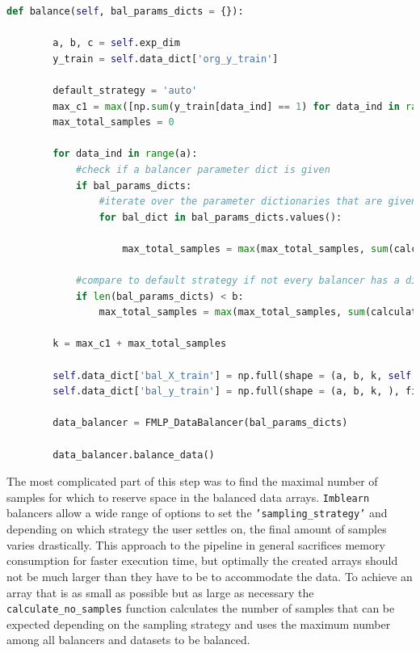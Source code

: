\begin{lstlisting}[language=Python, numbers=none]
    def balance(self, bal_params_dicts = {}):

        a, b, c = self.exp_dim
        y_train = self.data_dict['org_y_train']

        default_strategy = 'auto'
        max_c1 = max([np.sum(y_train[data_ind] == 1) for data_ind in range(a)])
        max_total_samples = 0

        for data_ind in range(a):
            #check if a balancer parameter dict is given
            if bal_params_dicts:
                #iterate over the parameter dictionaries that are given
                for bal_dict in bal_params_dicts.values():

                    max_total_samples = max(max_total_samples, sum(calculate_no_samples(y_train[data_ind], bal_dict['sampling_strategy']).values()))

            #compare to default strategy if not every balancer has a dict
            if len(bal_params_dicts) < b:
                max_total_samples = max(max_total_samples, sum(calculate_no_samples(y_train[data_ind], default_strategy).values()))
        
        k = max_c1 + max_total_samples

        self.data_dict['bal_X_train'] = np.full(shape = (a, b, k, self.d), fill_value = np.nan)
        self.data_dict['bal_y_train'] = np.full(shape = (a, b, k, ), fill_value = np.nan)

        data_balancer = FMLP_DataBalancer(bal_params_dicts)
        
        data_balancer.balance_data()
\end{lstlisting}

The most complicated part of this step was to find the maximal number of samples for which to reserve space in the balanced data arrays.
\texttt{Imblearn} balancers allow a wide range of options to set the \texttt{'sampling\_strategy'} and depending on which strategy the user settles on,
the final amount of samples varies drastically. This approach to the pipeline in general sacrifices memory consumption for faster execution time, 
but optimally the created arrays should not be much larger than they have to be to accommodate the data. 
To achieve an array that is as small as possible but as large as necessary the \texttt{calculate\_no\_samples} function calculates the number of samples
that can be expected depending on the sampling strategy and uses the maximum number among all balancers and datasets to be balanced.


